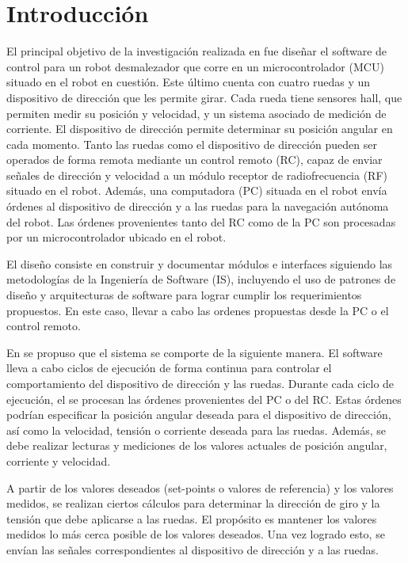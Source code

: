 \chapter{Introducción}

El principal objetivo de la investigación realizada en \cite{paperPomponio} fue diseñar el software de control para un robot desmalezador que corre en un microcontrolador (MCU) situado en el robot en cuestión. Este último cuenta con cuatro ruedas y un dispositivo de dirección que les permite girar. Cada rueda tiene sensores \gls{hall}, que permiten medir su posición y velocidad, y un sistema asociado de medición de corriente. El dispositivo de dirección permite determinar su posición angular en cada momento. Tanto las ruedas como el dispositivo de dirección pueden ser operados de forma remota mediante un control remoto (RC), capaz de enviar señales de dirección y velocidad a un módulo receptor de radiofrecuencia (RF) situado en el robot. Además, una computadora (PC) situada en el robot envía órdenes al dispositivo de dirección y a las ruedas para la navegación autónoma del robot. Las órdenes provenientes tanto del RC como de la PC son procesadas por un microcontrolador ubicado en el robot.

El diseño consiste en construir y documentar módulos e interfaces siguiendo las metodologías de la Ingeniería de Software (IS), incluyendo el uso de patrones de diseño y arquitecturas de software para lograr cumplir los requerimientos propuestos. En este caso, llevar a cabo las ordenes propuestas desde la PC o el control remoto.

En \cite{paperPomponio} se propuso que el sistema se comporte de la siguiente manera. El software lleva a cabo ciclos de ejecución de forma continua para controlar el comportamiento del dispositivo de dirección y las ruedas. Durante cada ciclo de ejecución, el se procesan las órdenes provenientes del PC o del RC. Estas órdenes podrían especificar la posición angular deseada para el dispositivo de dirección, así como la velocidad, tensión o corriente deseada para las ruedas. Además, se debe realizar lecturas y mediciones de los valores actuales de posición angular, corriente y velocidad.

A partir de los valores deseados (set-points o valores de referencia) y los valores medidos, se realizan ciertos cálculos para determinar la dirección de giro y la tensión que debe aplicarse a las ruedas. El propósito es mantener los valores medidos lo más cerca posible de los valores deseados. Una vez logrado esto, se envían las señales correspondientes al dispositivo de dirección y a las ruedas.

